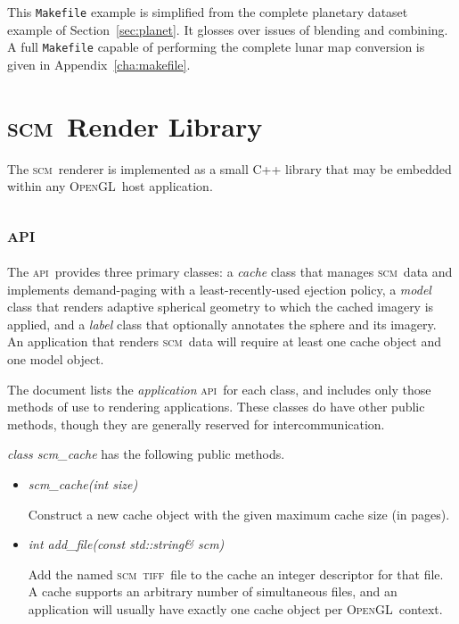 \documentclass[oneside,10pt]{memoir}
\newcommand{\opengl}  {\textsc{OpenGL}}
\newcommand{\scm}     {\textsc{scm}}
\newcommand{\tiff}    {\textsc{tiff}}
\newcommand{\api}     {\textsc{api}}
\begin{document}
\begin{Spacing}{1.1}
This \texttt{Makefile} example is simplified from the complete planetary dataset example of Section~\ref{sec:planet}. It glosses over issues of blending and combining. A full \texttt{Makefile} capable of performing the complete lunar map conversion is given in Appendix~\ref{cha:makefile}.


\chapter{\scm\ Render Library}

The \scm\ renderer is implemented as a small C++ library that may be embedded within any \opengl\ host application.

\section{\api}
\label{sec:api}

The \api\ provides three primary classes: a \emph{cache} class that manages \scm\ data and implements demand-paging with a least-recently-used ejection policy, a \emph{model} class that renders adaptive spherical geometry to which the cached imagery is applied, and a \emph{label} class that optionally annotates the sphere and its imagery. An application that renders \scm\ data will require at least one cache object and one model object.

The document lists the \emph{application} \api\ for each class, and includes only those methods of use to rendering applications. These classes do have other public methods, though they are generally reserved for intercommunication.

\bigskip\noindent\textit{class scm\_cache} has the following public methods.

\begin{itemize}
  \item\textit{scm\_cache(int size)}

    Construct a new cache object with the given maximum cache size (in pages).

  \item \textit{int add\_file(const std::string\& scm)}

    Add the named \scm\ \tiff\ file to the cache an integer descriptor for that file. A cache supports an arbitrary number of simultaneous files, and an application will usually have exactly one cache object per \opengl\ context.


\end{itemize}
\end{Spacing}
\end{document}
